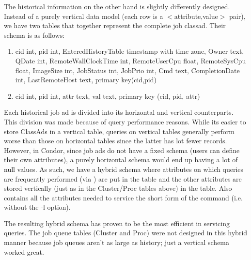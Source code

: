 The historical information on the other hand is slightly differently
designed.  Instead of a purely vertical data model (each row is a
$<$attribute,value$>$ pair), we have two tables that together represent the
complete job classad.  Their schema is as follows:

\begin{enumerate}

\item {}
        {cid                  int,
        pid                  int,
	EnteredHistoryTable  timestamp with time zone,
        Owner                text,
        QDate                int,
        RemoteWallClockTime  int,
        RemoteUserCpu        float,
        RemoteSysCpu         float,
        ImageSize            int,
        JobStatus            int,
        JobPrio              int,
        Cmd                  text,
        CompletionDate       int,
        LastRemoteHost       text,
        primary key(cid,pid)}

\item {}
	{cid int, pid int, attr text, val text, primary key
	(cid, pid, attr)}

\end{enumerate}

Each historical job ad is divided into its horizontal and vertical
counterparts.  This division was made because of query performance
reasons.  While its easier to store ClassAds in a vertical table,
queries on vertical tables generally perform worse than those on
horizontal tables since the latter has lot fewer records.  However, in
Condor, since job ads do not have a fixed schema (users can define their
own attributes), a purely horizontal schema would end up having a lot
of null values. As such, we have a hybrid schema where attributes on
which queries are frequently performed (via ) are put
in the  table and the other attributes
are stored vertically (just as in the Cluster/Proc tables above) in the
 table. Also 
contains all the attributes needed to service the short form of the
 command (i.e. without the -l option).

The resulting hybrid schema has proven to be the most efficient in
servicing  queries.  The job queue tables (Cluster and
Proc) were not designed in this hybrid manner because job queues aren't
as large as history; just a vertical schema worked great.


